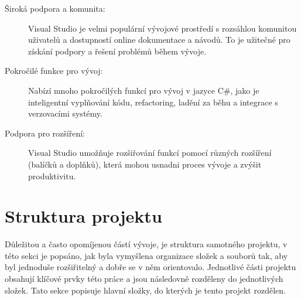 \begin{description}
	\item [Široká podpora a komunita:] Visual Studio je velmi populární vývojové prostředí s rozsáhlou komunitou uživatelů a dostupností online dokumentace a návodů. To je užitečné pro získání podpory a řešení problémů během vývoje.
	\item [Pokročilé funkce pro vývoj:] Nabízí mnoho pokročilých funkcí pro vývoj v jazyce C\#, jako je inteligentní vyplňování kódu, refactoring, ladění za běhu a integrace s verzovacími systémy. 
	\item [Podpora pro rozšíření:] Visual Studio umožňuje rozšiřování funkcí pomocí různých rozšíření (balíčků a doplňků), která mohou usnadni proces vývoje a zvýšit produktivitu.
\end{description}

\section{Struktura projektu}
Důležitou a často opomíjenou částí vývoje, je struktura samotného projektu, v této sekci je popsáno, jak byla vymyšlena organizace složek a souborů tak, aby byl jednoduše rozšiřitelný a dobře se v něm orientovalo. Jednotlivé části projektu obsahují klíčové prvky této práce a jsou následovně rozděleny do jednotlivých složek. Tato sekce popisuje hlavní složky, do kterých je tento projekt rozdělen.

